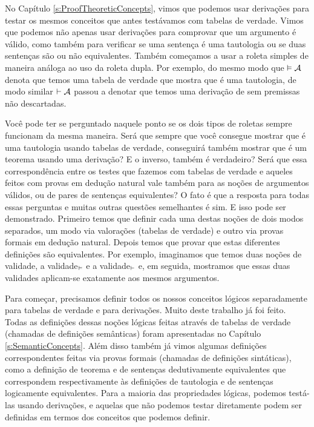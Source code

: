 No Capítulo \ref{s:ProofTheoreticConcepts}, vimos que podemos usar derivações para testar os mesmos conceitos que antes testávamos com tabelas de verdade. Vimos que podemos não apenas usar derivações para comprovar que um argumento é válido, como também para verificar se uma sentença é uma tautologia ou se duas sentenças são ou não equivalentes. Também começamos a usar a roleta simples de maneira análoga ao uso da roleta dupla. Por exemplo, do mesmo modo que  $\vDash \mathcal{A}$ denota que temos uma tabela de verdade que mostra que  é uma tautologia, de modo similar $\vdash \mathcal{A}$ passou a denotar que temos uma derivação de  sem premissas não descartadas.

Você pode ter se perguntado naquele ponto se os dois tipos de roletas sempre funcionam da mesma maneira. Será que sempre que você consegue mostrar que  é uma tautologia usando tabelas de verdade, conseguirá também mostrar que  é um teorema usando uma derivação? E o inverso, também é verdadeiro? Será que essa correspondência entre os testes que fazemos com tabelas de verdade e aqueles feitos com provas em dedução natural vale também para as noções de argumentos válidos, ou de pares de sentenças equivalentes? O fato é que a resposta para todas essas perguntas e muitas outras questões semelhantes é sim. E isso pode ser demonstrado. Primeiro temos que definir cada uma destas noções de dois modos separados, um modo via valorações (tabelas de verdade) e outro via provas formais em dedução natural. Depois temos que provar que estas diferentes definições são equivalentes. Por exemplo, imaginamos que temos duas noções de validade, a validade$_{\vDash}$ e a validade$_{\vdash}$ e, em seguida, mostramos que essas duas validades aplicam-se exatamente aos mesmos argumentos.

Para começar, precisamos definir todos os nossos conceitos lógicos separadamente para tabelas de verdade e  para derivações. Muito deste trabalho já foi feito. 
Todas as definições dessas noções lógicas feitas através de tabelas de verdade (chamadas de definições semânticas) foram apresentadas no  Capítulo \ref{s:SemanticConcepts}. Além disso também já vimos algumas definições correspondentes feitas via provas formais (chamadas de definições sintáticas), como a definição de teorema e de sentenças dedutivamente equivalentes que correspondem respectivamente às definições de tautologia e de sentenças logicamente equivalentes.
Para a maioria das propriedades lógicas, podemos testá-las usando derivações, e aquelas que não podemos testar diretamente podem ser definidas em termos dos conceitos que podemos definir.

